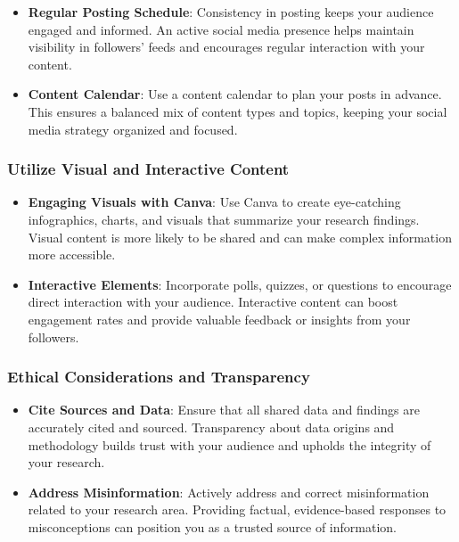 \documentclass[
]{book}
\begin{document}
\begin{itemize}
\item
  \textbf{Regular Posting Schedule}: Consistency in posting keeps your audience engaged and informed. An active social media presence helps maintain visibility in followers' feeds and encourages regular interaction with your content.
\item
  \textbf{Content Calendar}: Use a content calendar to plan your posts in advance. This ensures a balanced mix of content types and topics, keeping your social media strategy organized and focused.
\end{itemize}

\hypertarget{utilize-visual-and-interactive-content}{%
\subsubsection{Utilize Visual and Interactive Content}\label{utilize-visual-and-interactive-content}}

\begin{itemize}
\item
  \textbf{Engaging Visuals with Canva}: Use Canva to create eye-catching infographics, charts, and visuals that summarize your research findings. Visual content is more likely to be shared and can make complex information more accessible.
\item
  \textbf{Interactive Elements}: Incorporate polls, quizzes, or questions to encourage direct interaction with your audience. Interactive content can boost engagement rates and provide valuable feedback or insights from your followers.
\end{itemize}

\hypertarget{ethical-considerations-and-transparency}{%
\subsubsection{Ethical Considerations and Transparency}\label{ethical-considerations-and-transparency}}

\begin{itemize}
\item
  \textbf{Cite Sources and Data}: Ensure that all shared data and findings are accurately cited and sourced. Transparency about data origins and methodology builds trust with your audience and upholds the integrity of your research.
\item
  \textbf{Address Misinformation}: Actively address and correct misinformation related to your research area. Providing factual, evidence-based responses to misconceptions can position you as a trusted source of information.
\end{itemize}
\end{document}
